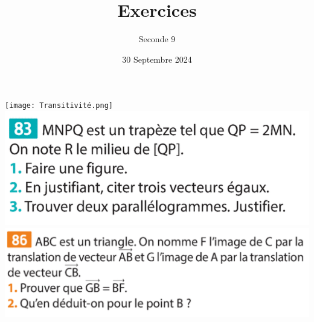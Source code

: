 \documentclass{article}
\title{Exercices}
\date{30 Septembre 2024}
\author{Seconde 9}
\begin{document}
\maketitle

\begin{center}
\texttt{[image: Transitivité.png]}
\includegraphics[width=\textwidth]{Trapeze.png}
\includegraphics[width=\textwidth]{Triangle.png}
\end{center}
\end{document}
